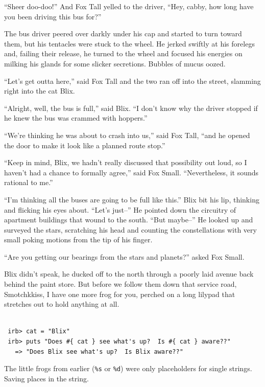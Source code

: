 \documentclass[10pt,twoside]{report}
\begin{document}
``Sheer doo-doo!''  And Fox Tall yelled to the driver, ``Hey, cabby,
how long have you been driving this bus for?''

The bus driver peered over darkly under his cap and started to turn
toward them, but his tentacles were stuck to the wheel.  He jerked
swiftly at his forelegs and, failing their release, he turned to the
wheel and focused his energies on milking his glands for some slicker
secretions.  Bubbles of mucus oozed.

``Let's get outta here,'' said Fox Tall and the two ran off into the
street, slamming right into the cat Blix.

``Alright, well, the bus is full,'' said Blix.  ``I don't know why the
driver stopped if he knew the bus was crammed with hoppers.''

``We're thinking he was about to crash into us,'' said Fox Tall, ``and
he opened the door to make it look like a planned route stop.''

``Keep in mind, Blix, we hadn't really discussed that possibility out
loud, so I haven't had a chance to formally agree,'' said Fox Small.
``Nevertheless, it sounds rational to me.''

``I'm thinking all the buses are going to be full like this.''  Blix
bit his lip, thinking and flicking his eyes about.  ``Let's just--''
He pointed down the circuitry of apartment buildings that wound to the
south.  ``But maybe--'' He looked up and surveyed the stars,
scratching his head and counting the constellations with very small
poking motions from the tip of his finger.

``Are you getting our bearings from the stars and planets?'' asked Fox
Small.

Blix didn't speak, he ducked off to the north through a poorly laid
avenue back behind the paint store. But before we follow them down
that service road, Smotchkkiss, I have one more frog for you, perched
on a long lilypad that stretches out to hold anything at all.


\begin{lstlisting}

 irb> cat = "Blix"
 irb> puts "Does #{ cat } see what's up?  Is #{ cat } aware??"
   => "Does Blix see what's up?  Is Blix aware??"

\end{lstlisting}


The little frogs from earlier (\lstinline[breaklines=true]|%s| or
\lstinline[breaklines=true]|%d|) were only placeholders for single
strings.  Saving places in the string.
\end{document}

